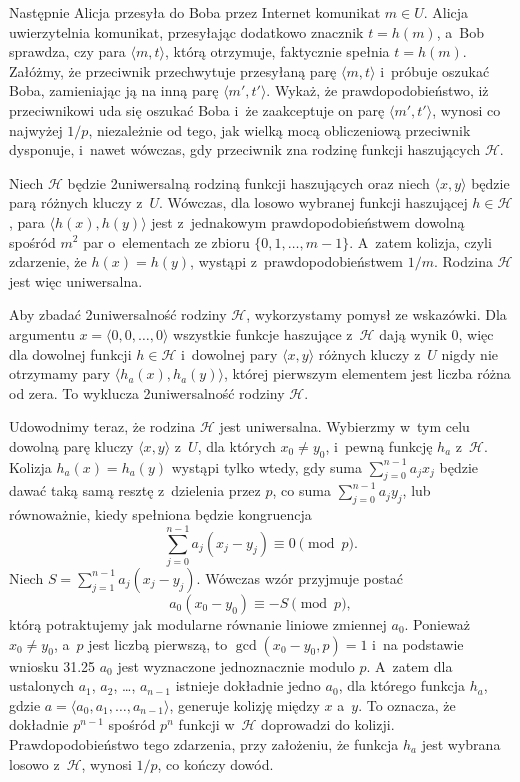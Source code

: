 \begin{description}
Następnie Alicja przesyła do Boba przez Internet komunikat $m\in U$.
Alicja uwierzytelnia komunikat, przesyłając dodatkowo znacznik $t=h(m)$, a~Bob sprawdza, czy para $\langle m,t\rangle$, którą otrzymuje, faktycznie spełnia $t=h(m)$.
Załóżmy, że przeciwnik przechwytuje przesyłaną parę $\langle m,t\rangle$ i~próbuje oszukać Boba, zamieniając ją na inną parę $\langle m',t'\rangle$.
Wykaż, że prawdopodobieństwo, iż przeciwnikowi uda się oszukać Boba i~że zaakceptuje on parę $\langle m',t'\rangle$, wynosi co najwyżej $1/p$, niezależnie od tego, jak wielką mocą obliczeniową przeciwnik dysponuje, i~nawet wówczas, gdy przeciwnik zna rodzinę funkcji haszujących $\mathcal{H}$.
\end{description}

\bigskip
\noindent{}
\bignegskip

\subproblem %
Niech $\mathcal{H}$ będzie 2\nbhyphen uniwersalną rodziną funkcji haszujących oraz niech $\langle x,y\rangle$ będzie parą różnych kluczy z~$U$.
Wówczas, dla losowo wybranej funkcji haszującej $h\in\mathcal{H}$, para $\langle h(x),h(y)\rangle$ jest z~jednakowym prawdopodobieństwem dowolną spośród $m^2$ par o~elementach ze zbioru $\{0,1,\dots,m-1\}$.
A~zatem kolizja, czyli zdarzenie, że $h(x)=h(y)$, wystąpi z~prawdopodobieństwem $1/m$.
Rodzina $\mathcal{H}$ jest więc uniwersalna.

\subproblem %
Aby zbadać 2\nbhyphen uniwersalność rodziny $\mathcal{H}$, wykorzystamy pomysł ze wskazówki.
Dla argumentu $x=\langle0,0,\dots,0\rangle$ wszystkie funkcje haszujące z~$\mathcal{H}$ dają wynik 0, więc dla dowolnej funkcji $h\in\mathcal{H}$ i~dowolnej pary $\langle x,y\rangle$ różnych kluczy z~$U$ nigdy nie otrzymamy pary $\langle h_a(x),h_a(y)\rangle$, której pierwszym elementem jest liczba różna od zera.
To wyklucza 2\nbhyphen uniwersalność rodziny $\mathcal{H}$.

Udowodnimy teraz, że rodzina $\mathcal{H}$ jest uniwersalna.
Wybierzmy w~tym celu dowolną parę kluczy $\langle x,y\rangle$ z~$U$, dla których $x_0\ne y_0$, i~pewną funkcję $h_a$ z~$\mathcal{H}$.
Kolizja $h_a(x)=h_a(y)$ wystąpi tylko wtedy, gdy suma $\sum_{j=0}^{n-1}a_jx_j$ będzie dawać taką samą resztę z~dzielenia przez $p$, co suma $\sum_{j=0}^{n-1}a_jy_j$, lub równoważnie, kiedy spełniona będzie kongruencja
\[
	\sum_{j=0}^{n-1}a_j(x_j-y_j) \equiv 0 \pmod p.
\]
Niech $S=\sum_{j=1}^{n-1}a_j(x_j-y_j)$.
Wówczas wzór przyjmuje postać
\[
	a_0(x_0-y_0) \equiv -S \pmod p,
\]
którą potraktujemy jak modularne równanie liniowe zmiennej $a_0$.
Ponieważ $x_0\ne y_0$, a~$p$ jest liczbą pierwszą, to $\gcd(x_0-y_0,p)=1$ i~na podstawie wniosku 31.25 $a_0$ jest wyznaczone jednoznacznie modulo $p$.
A~zatem dla ustalonych $a_1$, $a_2$, \dots, $a_{n-1}$ istnieje dokładnie jedno $a_0$, dla którego funkcja $h_a$, gdzie $a=\langle a_0,a_1,\dots,a_{n-1}\rangle$, generuje kolizję między $x$ a~$y$.
To oznacza, że dokładnie $p^{n-1}$ spośród $p^n$ funkcji w~$\mathcal{H}$ doprowadzi do kolizji.
Prawdopodobieństwo tego zdarzenia, przy założeniu, że funkcja $h_a$ jest wybrana losowo z~$\mathcal{H}$, wynosi $1/p$, co kończy dowód.

